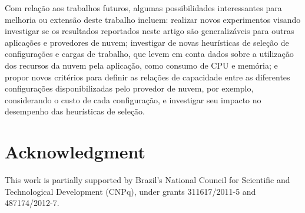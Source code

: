 \documentclass[10pt,conference,compsocconf]{IEEEtran}
\begin{document}
Com relação aos trabalhos futuros, algumas possibilidades interessantes para melhoria ou extensão deste trabalho incluem: realizar novos experimentos visando investigar se os resultados reportados neste artigo são generalizáveis para outras aplicações e provedores de nuvem; investigar de novas heurísticas de seleção de configurações e cargas de trabalho, que levem em conta dados sobre a utilização dos recursos da nuvem pela aplicação, como consumo de CPU e memória; e propor novos critérios para definir as relações de capacidade entre as diferentes configurações disponibilizadas pelo provedor de nuvem, por exemplo, considerando o custo de cada configuração, e investigar seu impacto no desempenho das heurísticas de seleção.



\section*{Acknowledgment}


This work is partially supported by Brazil's National Council for Scientific and Technological Development (CNPq), under grants 311617/2011-5 and 487174/2012-7.





%
%
%




\end{document}
